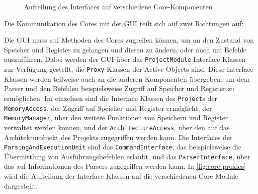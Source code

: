 \begin{figure}[H]
\begin{center}

    \end{center}
    \caption{Aufteilung des Interfaces auf verschiedene Core-Komponenten}
    \label{fig:core-proxies}
\end{figure}

Die Kommunikation des Cores mit der GUI teilt sich auf zwei Richtungen auf:

Die GUI muss auf Methoden des Cores zugreifen können, um an den Zustand von
Speicher und Register zu gelangen und diesen zu ändern, oder auch um Befehle
auszuführen. Dabei werden der GUI über das \texttt{ProjectModule} Interface
Klassen zur Verfügung gestellt, die \texttt{Proxy} Klassen der Active Objects
sind. Diese Interface Klassen werden teilweise auch an die anderen Komponenten
übergeben, um dem Parser und den Befehlen beispielsweise Zugriff auf Speicher
und Register zu ermöglichen. Im einzelnen sind die Interface Klassen des
\texttt{Project}s der \texttt{MemoryAccess}, der Zugriff auf Speicher und
Register ermöglicht, der \texttt{MemoryManager}, über den weitere Funktionen von
Speichern und Register verwaltet werden können, und der
\texttt{ArchitectureAccess}, über den auf das Architekturobjekt des Projekts
zugegriffen werden kann. Die Interfaces der \texttt{ParsingAndExecutionUnit}
sind das \texttt{CommandInterface}, das beispielsweise die Übermittlung von
Ausführungsbefehlen erlaubt, und das \texttt{ParserInterface}, über das auf
Informationen des Parsers zugegriffen werden kann. In \autoref{fig:core-proxies}
wird die Aufteilung der Interface Klassen auf die verschiedenen Core Module
dargestellt.

